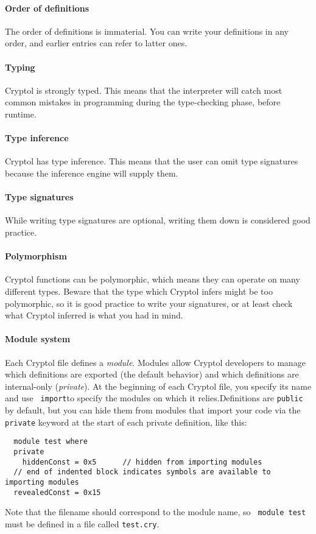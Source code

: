 \paragraph*{Order of definitions}
The order of definitions is immaterial. You can write your definitions
in any order, and earlier entries can refer to latter ones.

\paragraph*{Typing}
Cryptol is strongly typed. This means that the interpreter will catch
most common mistakes in programming during the type-checking phase,
before runtime.

\paragraph*{Type inference}
Cryptol has type inference. This means that the user can omit type
signatures because the inference engine will supply
them.\indTypeInference

\paragraph*{Type signatures}
While writing type signatures are optional, writing them down is
considered good practice.\indSignature

\paragraph*{Polymorphism}
Cryptol functions can be polymorphic, which means they can operate on
many different types.  Beware that the type which Cryptol infers might
be too polymorphic, so it is good practice to write your signatures,
or at least check what Cryptol inferred is what you had in
mind.\indPolymorphism\indSignature

\paragraph*{Module system} 
Each Cryptol file defines a {\it module}. Modules allow Cryptol
developers to manage which definitions are exported (the default
behavior) and which definitions are internal-only ({\it private}). At
the beginning of each Cryptol file, you specify its name and use {\tt
  import}\indImport to specify the modules on which it
relies.\indModuleSystem  Definitions are {\tt public} by default, but
you can hide them from modules that import your code via the {\tt
  private} keyword at the start of each private definition,\indPrivate
like this:
\begin{Verbatim}
  module test where
  private
    hiddenConst = 0x5      // hidden from importing modules
  // end of indented block indicates symbols are available to importing modules
  revealedConst = 0x15
\end{Verbatim}
Note that the filename should correspond to the module name, so {\tt
  module test} must be defined in a file called {\tt test.cry}.

